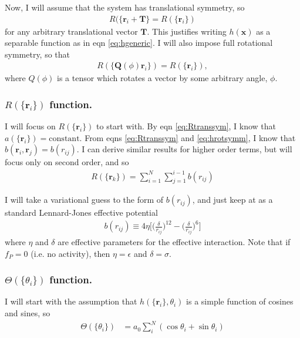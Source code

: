 \documentclass{article}
\begin{document}
Now, I will assume that the system has translational symmetry, so
\begin{align}\label{eq:Rtranssym}
  R(\{\bm{r}_i+\bm{T}\}=R(\{\bm{r}_i\})
\end{align}
for any arbitrary translational vector $\bm{T}$. This justifies writing $h(\bm{x})$ as a separable
function as in eqn \ref{eq:hgeneric}. I will also impose full rotational symmetry, so that
\begin{align}\label{eq:hrotsymm}
  R(\{\bm{Q}(\phi)\bm{r}_i\})=R(\{\bm{r}_i\}),
\end{align}
where $Q(\phi)$ is a tensor which rotates a vector by some arbitrary angle, $\phi$.

\subsubsection{$R(\{\bm{r}_i\})$ function.}

I will focus on $R(\{\bm{r}_i\})$ to start with. By eqn \ref{eq:Rtranssym}, I know that
$a(\{\bm{r}_i\})=\mathrm{constant}$. From eqns \ref{eq:Rtranssym} and \ref{eq:hrotsymm}, I know
that $b(\bm{r}_i,\bm{r}_j)=b(r_{ij})$. I can derive similar results for higher order
terms, but will focus only on second order, and so
\begin{align}
  R(\{\bm{r}_k\})= \sum_{i=1}^N\sum_{j=1}^{i-1}b(r_{ij})
\end{align}

I will take a variational guess to the form of $b(r_{ij})$, and just keep at as a standard
Lennard-Jones effective potential
\begin{align}
  b(r_{ij})\equiv 4\eta\bigg[\bigg(\frac{\delta}{r_{ij}}\bigg)^{12}-
  \bigg(\frac{\delta}{r_{ij}}\bigg)^6\bigg]
\end{align}
where $\eta$ and $\delta$ are effective parameters for the effective interaction. Note that if
$f_P=0$ (i.e. no activity), then $\eta=\epsilon$ and $\delta=\sigma$.

\subsubsection{$\Theta(\{\theta_i\})$ function.}

I will start with the assumption that $h(\{\bm{r}_i\},\theta_i)$ is a simple function of
cosines and sines, so
\begin{align}
  \Theta(\{\theta_i\})&=a_0\sum_i^N(\cos\theta_i+\sin\theta_i)
\end{align}
\end{document}
